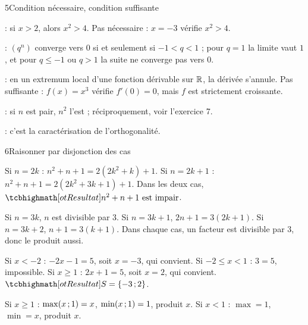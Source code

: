 \begin{deuxcolonnes}
\begin{corrige}{5}{Condition nécessaire, condition suffisante}
\begin{questions}
  \item {} : si $x>2$, alors $x^{2}>4$. Pas nécessaire : $x=-3$ vérifie $x^{2}>4$.
  \item {} : $(q^{n})$ converge vers $0$ si et seulement si $-1<q<1$ ; pour $q=1$ la limite
    vaut $1$, et pour $q\leq-1$ ou $q>1$ la suite ne converge pas vers $0$.
  \item {} : en un extremum local d'une fonction dérivable sur $\mathbb{R}$, la dérivée s'annule. Pas suffisante :
    $f(x)=x^{3}$ vérifie $f'(0)=0$, mais $f$ est strictement croissante.
  \item {} : si $n$ est pair, $n^{2}$ l'est ; réciproquement, voir l'exercice 7.
  \item {} : c'est la caractérisation de l'orthogonalité.
\end{questions}
\end{corrige}

\begin{corrige}{6}{Raisonner par disjonction des cas}
\begin{questions}
  \item Si $n=2k$ : $n^{2}+n+1=2(2k^{2}+k)+1$. Si $n=2k+1$ : $n^{2}+n+1=2(2k^{2}+3k+1)+1$. Dans les deux cas,
    $\res{n^{2}+n+1\text{ est impair}}$.
  \item Si $n=3k$, $n$ est divisible par $3$. Si $n=3k+1$, $2n+1=3(2k+1)$. Si $n=3k+2$, $n+1=3(k+1)$. Dans chaque cas, un
    facteur est divisible par $3$, donc le produit aussi.
  \item Si $x<-2$ : $-2x-1=5$, soit $x=-3$, qui convient. Si $-2\leq x<1$ : $3=5$, impossible. Si $x\geq1$ : $2x+1=5$, soit
    $x=2$, qui convient. $\res{S=\ens{-3\pv2}}$.
  \item Si $x\geq1$ : $\max(x\,{;}\,1)=x$, $\min(x\,{;}\,1)=1$, produit $x$. Si $x<1$ : $\max=1$, $\min=x$, produit $x$.
\end{questions}
\end{corrige}


\end{deuxcolonnes}
